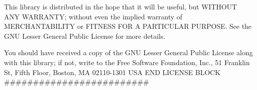 This library is distributed in the hope that it will be useful, but W\+I\+T\+H\+O\+UT A\+NY W\+A\+R\+R\+A\+N\+TY; without even the implied warranty of M\+E\+R\+C\+H\+A\+N\+T\+A\+B\+I\+L\+I\+TY or F\+I\+T\+N\+E\+SS F\+OR A P\+A\+R\+T\+I\+C\+U\+L\+AR P\+U\+R\+P\+O\+SE. See the G\+NU Lesser General Public License for more details.

You should have received a copy of the G\+NU Lesser General Public License along with this library; if not, write to the Free Software Foundation, Inc., 51 Franklin St, Fifth Floor, Boston, MA 02110-\/1301 U\+SA E\+ND L\+I\+C\+E\+N\+SE B\+L\+O\+CK \#\#\#\#\#\#\#\#\#\#\#\#\#\#\#\#\#\#\#\#\#\#\#\#\# 